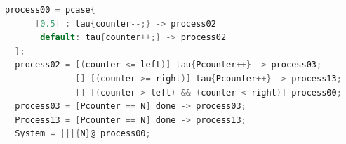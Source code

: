\documentclass[10pt, landscape]{article}
\begin{document}
\begin{multicols*}{2}
\begin{lstlisting}[language=C, basicstyle=\scriptsize\selectfont\ttfamily, mathescape]
  process00 = pcase{ 
      [0.5] : tau{counter--;} -> process02 
       default: tau{counter++;} -> process02
  };
  process02 = [(counter <= left)] tau{Pcounter++} -> process03;
              [] [(counter >= right)] tau{Pcounter++} -> process13;
              [] [(counter > left) && (counter < right)] process00;
  process03 = [Pcounter == N] done -> process03;
  Process13 = [Pcounter == N] done -> process13;
  System = |||{N}@ process00;    
  \end{lstlisting}
\end{multicols*}
\end{document}
